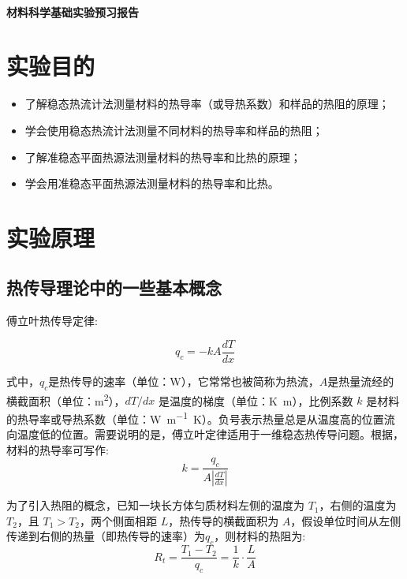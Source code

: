 \documentclass[a4paper,utf8]{article}
\begin{document}
\begin{center}
    {\mbox{}\\[7em]\bfseries\songti%
    材料科学基础实验预习报告}\\[34mm]
\end{center}
\newpage
\section{实验目的}
    \begin{itemize}
        \item 了解稳态热流计法测量材料的热导率（或导热系数）和样品的热阻的原理；
        \item 学会使用稳态热流计法测量不同材料的热导率和样品的热阻；
        \item 了解准稳态平面热源法测量材料的热导率和比热的原理；
        \item 学会用准稳态平面热源法测量材料的热导率和比热。
    \end{itemize}
\section{实验原理}%
    \subsection{热传导理论中的一些基本概念}
        傅立叶热传导定律:\par
        \begin{equation}
            q_c=-kA\frac{dT}{dx} \label{eq:1}
        \end{equation} \par
        式中，$q_c$是热传导的速率（单位：\unit{\watt}），它常常也被简称为热流，$A$是热量流经的横截面积（单位：\unit{\meter\squared}），$dT/dx$ 是温度的梯度（单位：\unit{\kelvin\metre}），比例系数 $k$ 是材料的热导率或导热系数（单位：\unit{\watt\per\meter\kelvin}）。负号表示热量总是从温度高的位置流向温度低的位置。需要说明的是，傅立叶定律适用于一维稳态热传导问题。根据，材料的热导率可写作:
        \begin{equation}
            k=\frac{q_c}{A \displaystyle \left|\frac{dT}{dx}\right|} \label{eq:2}
        \end{equation} \par
        为了引入热阻的概念，已知一块长方体匀质材料左侧的温度为 $T_1$，右侧的温度为 $T_2$，且 $T_1 > T_2$，两个侧面相距 $L$，热传导的横截面积为 $A$，假设单位时间从左侧传递到右侧的热量（即热传导的速率）为$q_c$，则材料的热阻为:
        \begin{equation}
            R_t=\frac{T_1-T_2}{q_c}=\frac{1}{k}\cdot\frac{L}{A} \label{eq:3}
        \end{equation} \par
\end{document}
